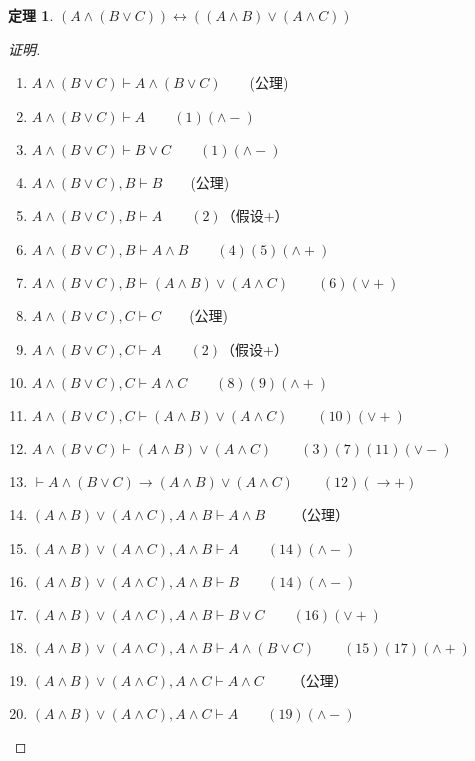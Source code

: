 \documentclass{article}
\newtheorem{Thm}{定理}
\begin{document}
\begin{CJK*}{UTF8}{gbsn}
  \begin{Thm}$(A\land (B\lor C))\leftrightarrow ((A\land B) \lor (A\land C))$\end{Thm}
  \begin{proof}[证明]$\quad$
    \begin{enumerate}
      \item $ A\land (B\lor C)\vdash A\land (B\lor C)\qquad $(公理) 
      \item $ A\land (B\lor C)\vdash A\qquad (1)(\land -)$
      \item $ A\land (B\lor C)\vdash B\lor C\qquad (1)(\land -)$
      \item $ A\land (B\lor C),B\vdash B\qquad$(公理)
      \item $ A\land (B\lor C),B\vdash A\qquad(2)$（假设+）
      \item $ A\land (B\lor C),B\vdash A\land B\qquad(4)(5)(\land +)$
      \item $ A\land (B\lor C),B\vdash (A\land B) \lor (A\land C)\qquad (6)(\lor +)$ 
      \item $ A\land (B\lor C),C\vdash C\qquad$(公理)
      \item $ A\land (B\lor C),C\vdash A\qquad(2)$（假设+）
      \item $ A\land (B\lor C),C\vdash A\land C\qquad(8)(9)(\land +)$
      \item $ A\land (B\lor C),C\vdash (A\land B) \lor (A\land C)\qquad (10)(\lor +)$ 
      \item $ A\land (B\lor C)\vdash (A\land B) \lor (A\land C) \qquad(3)(7)(11)(\lor -)$
      \item $\vdash A\land (B\lor C)\to (A\land B) \lor (A\land C)  \qquad(12)(\to +)$
      \item $(A\land B) \lor (A\land C), A\land B \vdash A\land B\qquad$（公理）
      \item $(A\land B) \lor (A\land C), A\land B \vdash A \qquad (14)(\land -)$
      \item $(A\land B) \lor (A\land C), A\land B \vdash B \qquad (14)(\land -) $
      \item $(A\land B) \lor (A\land C), A\land B \vdash B\lor C \qquad (16)(\lor +)  $ 
      \item $(A\land B) \lor (A\land C), A\land B \vdash A\land(B\lor C) \qquad (15)(17)(\land +)$
      \item $(A\land B) \lor (A\land C), A\land C \vdash A\land C\qquad$（公理）
      \item $(A\land B) \lor (A\land C), A\land C \vdash A \qquad (19)(\land -)$

\end{enumerate}
\end{proof}
\end{CJK*}
\end{document}
